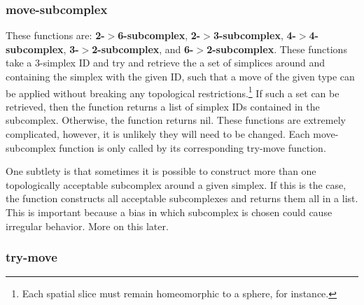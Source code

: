 \message{ !name(programmers_guide.tex)}\documentclass[12pt]{article}
\begin{document}
\subsubsection{move-subcomplex}

These functions are: \textbf{2-$>$6-subcomplex},
\textbf{2-$>$3-subcomplex}, \textbf{4-$>$4-subcomplex},
\textbf{3-$>$2-subcomplex}, and \textbf{6-$>$2-subcomplex}. These
functions take a 3-simplex ID and try and retrieve the a set of
simplices around and containing the simplex with the given ID, such
that a move of the given type can be applied without breaking any
topological restrictions.\footnote{Each spatial slice must remain
  homeomorphic to a sphere, for instance.} If such a set can be
retrieved, then the function returns a list of simplex IDs contained
in the subcomplex. Otherwise, the function returns nil. These
functions are extremely complicated, however, it is unlikely they will
need to be changed. Each move-subcomplex function is only called by
its corresponding try-move function.

One subtlety is that sometimes it is possible to construct more than
one topologically acceptable subcomplex around a given simplex. If
this is the case, the function constructs all acceptable subcomplexes
and returns them all in a list. This is important because a bias in
which subcomplex is chosen could cause irregular behavior. More on
this later.

\subsubsection{try-move}
\end{document}
